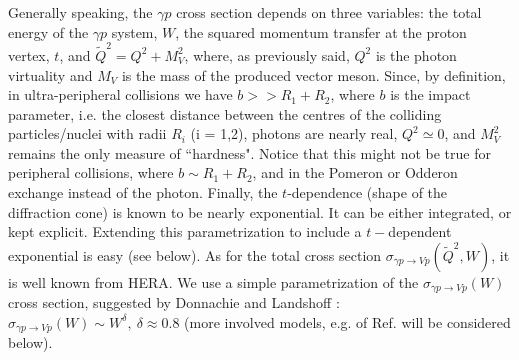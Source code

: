 \documentclass[12pt]{article}
\begin{document}
Generally speaking, the $\gamma p$ cross section depends on three variables: the total energy   of the $\gamma p$ system, $W$, 
the squared momentum transfer at the proton vertex, $t$, and $\widetilde Q^2=Q^2+M_V^2$, where, as previously said, $Q^2$ is the photon virtuality and $M_V$ is the mass of the produced vector meson. Since, by definition, in ultra-peripheral collisions we have $b>>R_1+R_2$, where $b$ is the impact parameter, i.e. the closest distance between the centres of the colliding particles/nuclei with radii  $R_i$ (i = 1,2),
photons are nearly real, $Q^2 \simeq 0$, and $M_V^2$ remains the only measure of  ``hardness". Notice that this might not be true for peripheral collisions, where $b\sim R_1+R_2$, and in the 
Pomeron or Odderon exchange instead of the photon. Finally, the $t$-dependence (shape of the diffraction cone) is known to be nearly exponential. It can be either integrated, or
kept explicit. Extending this parametrization to include a $t-$dependent exponential is easy (see below).
As for the total cross section $\sigma_{\gamma p\rightarrow Vp}(\widetilde Q^2, W)$, it is well known from HERA. 
We use a simple parametrization of the $\sigma_{\gamma p\rightarrow Vp}(W)$ cross section, 
suggested by Donnachie and Landshoff \cite{DL}: $\sigma_{\gamma p\rightarrow Vp}(W)\sim W^{\delta},\ \delta\approx 0.8$ (more involved models, e.g. of Ref. \cite{FFJS, Capua} will be considered below).
\end{document}
